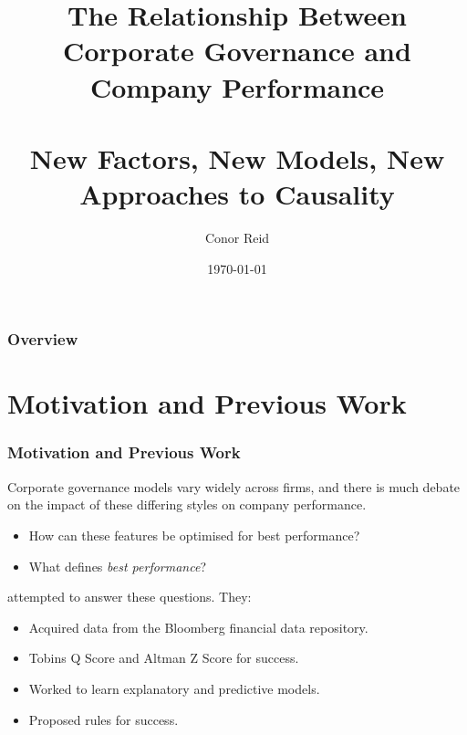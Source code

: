 \documentclass{beamer}
\title[Corporate Governance and Performance]{The Relationship Between Corporate Governance and Company Performance \\~\\ \small {New Factors, New Models, New Approaches to Causality} } %
\author{Conor Reid} %
\institute [UCD Smurfit School] %
{
Dr. James McDermott \& Dr. Miguel Nicolau \\
\medskip
UCD Michael Smurfit Graduate Business School \\
\medskip
\textit{conor.reid@ucdconnect.ie} %
}
\date{\today} %
\begin{document}
\begin{frame}
\titlepage %
\end{frame}

\begin{frame}
\frametitle{Overview} %
\tableofcontents %
\end{frame}



\section{Motivation and Previous Work}
\begin{frame}[t]
\frametitle{Motivation and Previous Work}
{Corporate governance models vary widely across firms, and there is much debate on the impact of these differing styles on company performance.}
\begin{itemize}
\item {How can these features be optimised for best performance? }
\item {What defines {\it best performance}?}
\end{itemize}

\vspace{1cm}

{\cite{moldovan2015learning} attempted to answer these questions. They:}
\begin{itemize}
\item {Acquired data from the Bloomberg financial data repository.}
\item {Tobins Q Score and Altman Z Score for success.}
\item {Worked to learn explanatory and predictive models.}
\item {Proposed rules for success. }
\end{itemize}

\end{frame}
\end{document}
